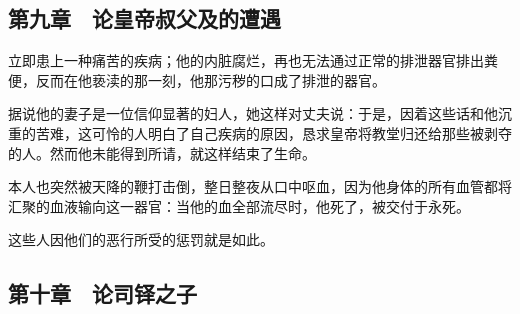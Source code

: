 
\subsection{第九章　论皇帝叔父及的遭遇}

立即患上一种痛苦的疾病；他的内脏腐烂，再也无法通过正常的排泄器官排出粪便，反而在他亵渎的那一刻，他那污秽的口成了排泄的器官。\par

据说他的妻子是一位信仰显著的妇人，她这样对丈夫说：于是，因着这些话和他沉重的苦难，这可怜的人明白了自己疾病的原因，恳求皇帝将教堂归还给那些被剥夺的人。然而他未能得到所请，就这样结束了生命。\par

本人也突然被天降的鞭打击倒，整日整夜从口中呕血，因为他身体的所有血管都将汇聚的血液输向这一器官：当他的血全部流尽时，他死了，被交付于永死。\par

这些人因他们的恶行所受的惩罚就是如此。\par


\subsection{第十章　论司铎之子}

